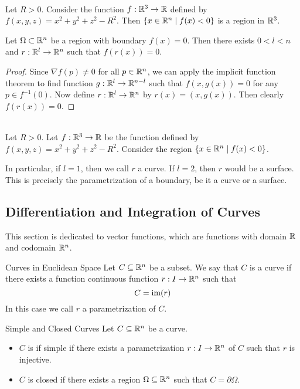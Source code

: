 \documentclass[a4paper]{article}
\begin{document}
\begin{eg}{}{}\\
Let $R>0$. Consider the function $f:\mathbb{R}^3\to\mathbb{R}$ defined by $f(x,y,z)=x^2+y^2+z^2-R^2$. Then $\{x\in\mathbb{R}^n\;|\;f(x)<0\}$ is a region in $\mathbb{R}^3$. 
\end{eg}

\begin{prp}{}{} Let $\Omega\subset\mathbb{R}^n$ be a region with boundary $f(x)=0$. Then there exists $0<l<n$ and $r:\mathbb{R}^l\to\mathbb{R}^n$ such that $f(r(x))=0$. 
\begin{proof}
Since $\nabla f(p)\neq 0$ for all $p\in\mathbb{R}^n$, we can apply the implicit function theorem to find function $g:\mathbb{R}^l\to\mathbb{R}^{n-l}$ such that $f(x,g(x))=0$ for any $p\in f^{-1}(0)$. Now define $r:\mathbb{R}^l\to\mathbb{R}^n$ by $r(x)=(x,g(x))$. Then clearly $f(r(x))=0$. 
\end{proof}
\end{prp}

\begin{eg}{}{}\\
Let $R>0$. Let $f:\mathbb{R}^3\to\mathbb{R}$ be the function defined by $f(x,y,z)=x^2+y^2+z^2-R^2$. Consider the region $\{x\in\mathbb{R}^n\;|\;f(x)<0\}$. 
\end{eg}

In particular, if $l=1$, then we call $r$ a curve. If $l=2$, then $r$ would be a surface. This is precisely the parametrization of a boundary, be it a curve or a surface. 

\subsection{Differentiation and Integration of Curves}
This section is dedicated to vector functions, which are functions with domain $\mathbb{R}$ and codomain $\mathbb{R}^n$. 

\begin{defn}{Curves in Euclidean Space}{} Let $C\subseteq\mathbb{R}^n$ be a subset. We say that $C$ is a curve if there exists a function continuous function $r:I\to\mathbb{R}^n$ such that $$C=\operatorname{im}(r)$$ In this case we call $r$ a parametrization of $C$. 
\end{defn}

\begin{defn}{Simple and Closed Curves}{} Let $C\subseteq\mathbb{R}^n$ be a curve. 
\begin{itemize}
\item $C$ is if simple if there exists a parametrization $r:I\to\mathbb{R}^n$ of $C$ such that $r$ is injective. 
\item $C$ is closed if there exists a region $\Omega\subseteq\mathbb{R}^n$ such that $C=\partial\Omega$. 
\end{itemize}
\end{defn}
\end{document}
